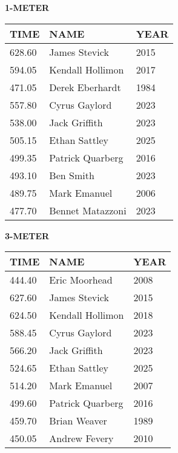 \begin{center}
\begin{minipage}[t]{0.7\textwidth}
\centering
\textbf{1-METER}\\[0.05cm]
\begin{tabular}{@{}p{1.8cm}p{2.8cm}p{1.2cm}@{}}
\hline
\textbf{TIME} & \textbf{NAME} & \textbf{YEAR} \\
\hline
628.60 & James Stevick & 2015 \\
594.05 & Kendall Hollimon & 2017 \\
471.05 & Derek Eberhardt & 1984 \\
557.80 & Cyrus Gaylord & 2023 \\
538.00 & Jack Griffith & 2023 \\
505.15 & Ethan Sattley & 2025 \\
499.35 & Patrick Quarberg & 2016 \\
493.10 & Ben Smith & 2023 \\
489.75 & Mark Emanuel & 2006 \\
477.70 & Bennet Matazzoni & 2023 \\
\hline
\end{tabular}
\end{minipage}
\end{center}

\vspace{0.4cm}

\begin{center}
\begin{minipage}[t]{0.7\textwidth}
\centering
\textbf{3-METER}\\[0.05cm]
\begin{tabular}{@{}p{1.8cm}p{2.8cm}p{1.2cm}@{}}
\hline
\textbf{TIME} & \textbf{NAME} & \textbf{YEAR} \\
\hline
444.40 & Eric Moorhead & 2008 \\
627.60 & James Stevick & 2015 \\
624.50 & Kendall Hollimon & 2018 \\
588.45 & Cyrus Gaylord & 2023 \\
566.20 & Jack Griffith & 2023 \\
524.65 & Ethan Sattley & 2025 \\
514.20 & Mark Emanuel & 2007 \\
499.60 & Patrick Quarberg & 2016 \\
459.70 & Brian Weaver & 1989 \\
450.05 & Andrew Fevery & 2010 \\
\hline
\end{tabular}
\end{minipage}
\end{center}

